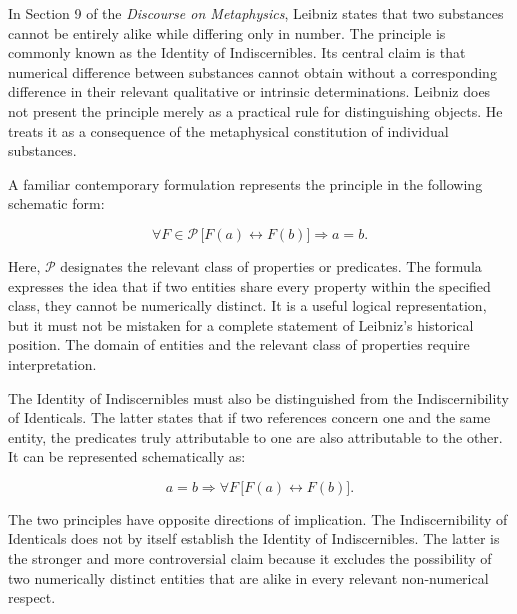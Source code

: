 \label{para:VS.B01.P01.C08.S07.SS04.P001}

In Section 9 of the \textit{Discourse on Metaphysics},
Leibniz states that two substances cannot be entirely
alike while differing only in number. The principle
is commonly known as the Identity of Indiscernibles.
Its central claim is that numerical difference between
substances cannot obtain without a corresponding
difference in their relevant qualitative or intrinsic
determinations. Leibniz does not present the principle
merely as a practical rule for distinguishing objects.
He treats it as a consequence of the metaphysical
constitution of individual substances. \cite[§9]{LeibnizDiscourse}

\label{para:VS.B01.P01.C08.S07.SS04.P002}

A familiar contemporary formulation represents the
principle in the following schematic form:

\[
\forall F\in\mathcal{P}\,
\bigl[
F(a)\leftrightarrow F(b)
\bigr]
\Rightarrow a=b.
\]

Here, \(\mathcal{P}\) designates the relevant class
of properties or predicates. The formula expresses
the idea that if two entities share every property
within the specified class, they cannot be numerically
distinct. It is a useful logical representation,
but it must not be mistaken for a complete statement
of Leibniz's historical position. The domain of
entities and the relevant class of properties require
interpretation. \cite{RodriguezPereyraIdentitySEP2025}

\label{para:VS.B01.P01.C08.S07.SS04.P003}

The Identity of Indiscernibles must also be distinguished
from the Indiscernibility of Identicals. The latter
states that if two references concern one and the
same entity, the predicates truly attributable to
one are also attributable to the other. It can be
represented schematically as:

\[
a=b
\Rightarrow
\forall F\,
\bigl[
F(a)\leftrightarrow F(b)
\bigr].
\]

The two principles have opposite directions of
implication. The Indiscernibility of Identicals
does not by itself establish the Identity of
Indiscernibles. The latter is the stronger and
more controversial claim because it excludes
the possibility of two numerically distinct
entities that are alike in every relevant
non-numerical respect. \cite{RodriguezPereyraIdentitySEP2025}

